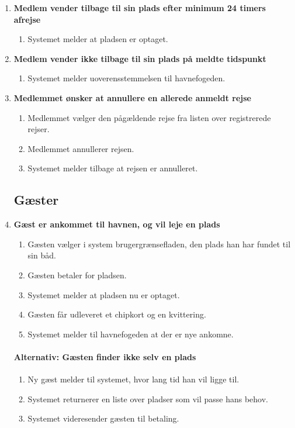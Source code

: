 \begin{enumerate}
    \item{\bf{Medlem vender tilbage til sin plads efter minimum 24 timers afrejse}}
      \begin{enumerate}
        \item Systemet melder at pladsen er optaget.
      \end{enumerate}


    \item{\bf{Medlem vender ikke tilbage til sin plads på meldte tidspunkt}}
      \begin{enumerate}
        \item Systemet melder uoverensstemmelsen til havnefogeden.
      \end{enumerate}


    \item{\bf{Medlemmet ønsker at annullere en allerede anmeldt rejse}}
      \begin{enumerate}
        \item Medlemmet vælger den pågældende rejse fra listen over registrerede rejser.
        \item Medlemmet annullerer rejsen.
        \item Systemet melder tilbage at rejsen er annulleret.
      \end{enumerate}


\subsection{Gæster}


    \item{\bf{Gæst er ankommet til havnen, og vil leje en plads}}
      \begin{enumerate}
        \item Gæsten vælger i system brugergrænsefladen, den plads han har fundet til sin båd.
        \item Gæsten betaler for pladsen.
        \item Systemet melder at pladsen nu er optaget.
        \item Gæsten får udleveret et chipkort og en kvittering.
        \item Systemet melder til havnefogeden at der er nye ankomne.
      \end{enumerate}

    \paragraph{Alternativ: Gæsten finder ikke selv en plads}
      \begin{enumerate}
        \item Ny gæst melder til systemet, hvor lang tid han vil ligge til.
        \item Systemet returnerer en liste over pladser som vil passe hans behov.
        \item Systemet videresender gæsten til betaling.


\end{enumerate}
\end{enumerate}
